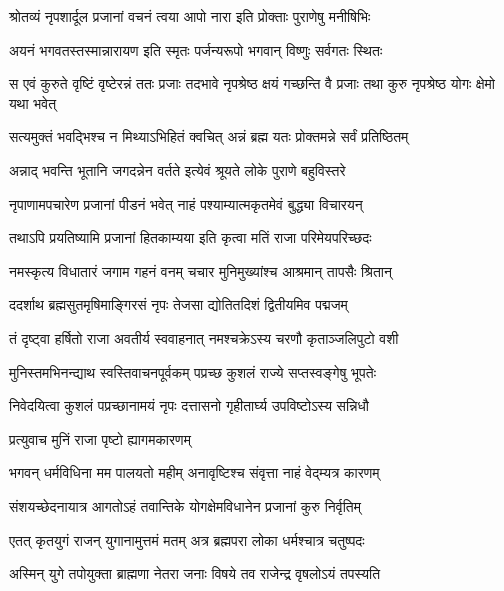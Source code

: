 
\twolineshloka
{श्रोतव्यं नृपशार्दूल प्रजानां वचनं त्वया}
{आपो नारा इति प्रोक्ताः पुराणेषु मनीषिभिः}%

\twolineshloka
{अयनं भगवतस्तस्मान्नारायण इति स्मृतः}
{पर्जन्यरूपो भगवान् विष्णुः सर्वगतः स्थितः}%

\threelineshloka
{स एवं कुरुते वृष्टिं वृष्टेरन्नं ततः प्रजाः}
{तदभावे नृपश्रेष्ठ क्षयं गच्छन्ति वै प्रजाः}
{तथा कुरु नृपश्रेष्ठ योगः क्षेमो यथा भवेत्}%


\twolineshloka
{सत्यमुक्तं भवद्भिश्च न मिथ्याऽभिहितं क्वचित्}
{अन्नं ब्रह्म यतः प्रोक्तमन्ने सर्वं प्रतिष्ठितम्}%

\twolineshloka
{अन्नाद् भवन्ति भूतानि जगदन्नेन वर्तते}
{इत्येवं श्रूयते लोके पुराणे बहुविस्तरे}%

\twolineshloka
{नृपाणामपचारेण प्रजानां पीडनं भवेत्}
{नाहं पश्याम्यात्मकृतमेवं बुद्ध्या विचारयन्}%

\twolineshloka
{तथाऽपि प्रयतिष्यामि प्रजानां हितकाम्यया}
{इति कृत्वा मतिं राजा परिमेयपरिच्छदः}%

\twolineshloka
{नमस्कृत्य विधातारं जगाम गहनं वनम्}
{चचार मुनिमुख्यांश्च आश्रमान् तापसैः श्रितान्}%

\twolineshloka
{ददर्शाथ ब्रह्मसुतमृषिमाङ्गिरसं नृपः}
{तेजसा द्योतितदिशं द्वितीयमिव पद्मजम्}%

\twolineshloka
{तं दृष्ट्वा हर्षितो राजा अवतीर्य स्ववाहनात्}
{नमश्चक्रेऽस्य चरणौ कृताञ्जलिपुटो वशी}%

\twolineshloka
{मुनिस्तमभिनन्द्याथ स्वस्तिवाचनपूर्वकम्}
{पप्रच्छ कुशलं राज्ये सप्तस्वङ्गेषु भूपतेः}%

\twolineshloka
{निवेदयित्वा कुशलं पप्रच्छानामयं नृपः}
{दत्तासनो गृहीतार्घ्य उपविष्टोऽस्य सन्निधौ}%

\onelineshloka
{प्रत्युवाच मुनिं राजा पृष्टो ह्यागमकारणम्}%


\twolineshloka
{भगवन् धर्मविधिना मम पालयतो महीम्}
{अनावृष्टिश्च संवृत्ता नाहं वेद्म्यत्र कारणम्}%

\twolineshloka
{संशयच्छेदनायात्र आगतोऽहं तवान्तिके}
{योगक्षेमविधानेन प्रजानां कुरु निर्वृतिम्}%


\twolineshloka
{एतत् कृतयुगं राजन् युगानामुत्तमं मतम्}
{अत्र ब्रह्मपरा लोका धर्मश्चात्र चतुष्पदः}%

\twolineshloka
{अस्मिन् युगे तपोयुक्ता ब्राह्मणा नेतरा जनाः}
{विषये तव राजेन्द्र वृषलोऽयं तपस्यति}%

